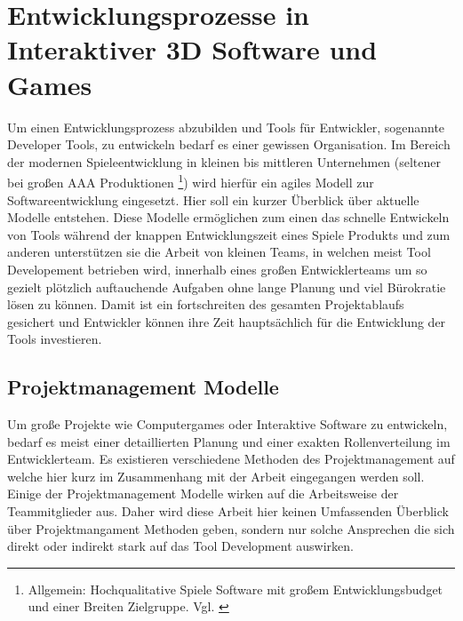 \documentclass[pagesize, paper=a4, fontsize=12pt,titlepage=true, headings=small, headnosepline, abstractoff, liststotoc, nochapterprefix, plainheadsepline, twoside]{scrreprt}
\begin{document}
\section{Entwicklungsprozesse in Interaktiver 3D Software und Games}
Um einen Entwicklungsprozess abzubilden und Tools für Entwickler, sogenannte Developer Tools, zu entwickeln bedarf es einer gewissen Organisation. Im Bereich der modernen Spieleentwicklung in kleinen bis mittleren Unternehmen (seltener bei großen AAA Produktionen \footnote{Allgemein: Hochqualitative Spiele Software mit großem Entwicklungsbudget und einer Breiten Zielgruppe. Vgl. \cite{GamasutraAAA2005} }) wird hierfür ein agiles Modell zur Softwareentwicklung eingesetzt. Hier soll ein kurzer Überblick über aktuelle Modelle entstehen. Diese Modelle ermöglichen zum einen das schnelle Entwickeln von Tools während der knappen Entwicklungszeit eines Spiele Produkts und zum anderen unterstützen sie die Arbeit von kleinen Teams, in welchen meist Tool Developement betrieben wird,  innerhalb eines großen Entwicklerteams um so gezielt plötzlich auftauchende Aufgaben ohne lange Planung und viel Bürokratie lösen zu können. Damit ist ein fortschreiten des gesamten Projektablaufs gesichert und Entwickler können ihre Zeit hauptsächlich für die Entwicklung der Tools investieren.
\subsection{Projektmanagement Modelle}
Um große Projekte wie Computergames oder Interaktive Software zu entwickeln, bedarf es meist einer detaillierten Planung und einer exakten Rollenverteilung im Entwicklerteam. Es existieren verschiedene Methoden des Projektmanagement auf welche hier kurz im Zusammenhang mit der Arbeit eingegangen werden soll. Einige der Projektmanagement Modelle wirken auf die Arbeitsweise der Teammitglieder aus. Daher wird diese Arbeit hier keinen Umfassenden Überblick über Projektmangament Methoden geben, sondern nur solche Ansprechen die sich direkt oder indirekt stark auf das Tool Development auswirken.
\end{document}
